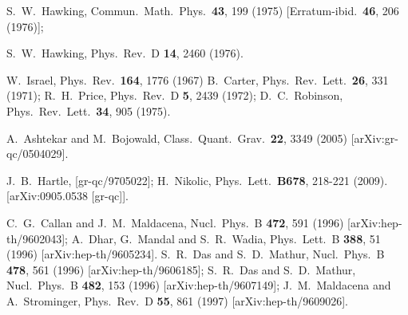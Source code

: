 \documentclass[12pt]{article}
\begin{document}
\begin{thebibliography}{10}


  S.~W.~Hawking,
  Commun.\ Math.\ Phys.\  {\bf 43}, 199 (1975)
  [Erratum-ibid.\  {\bf 46}, 206 (1976)];
  
  S.~W.~Hawking,
  Phys.\ Rev.\  D {\bf 14}, 2460 (1976).
  
  W.~Israel,
  Phys.\ Rev.\  {\bf 164}, 1776 (1967)
  B.~Carter,
  Phys.\ Rev.\ Lett.\  {\bf 26}, 331 (1971);
 R.~H.~Price,
  Phys.\ Rev.\  D {\bf 5}, 2439 (1972);
  D.~C.~Robinson,
  Phys.\ Rev.\ Lett.\  {\bf 34}, 905 (1975).

  A.~Ashtekar and M.~Bojowald,
  Class.\ Quant.\ Grav.\  {\bf 22}, 3349 (2005)
  [arXiv:gr-qc/0504029].

  J.~B.~Hartle,
   [gr-qc/9705022];
H.~Nikolic,
  Phys.\ Lett.\  {\bf B678}, 218-221 (2009).
  [arXiv:0905.0538 [gr-qc]].

C.~G.~Callan and J.~M.~Maldacena,
  Nucl.\ Phys.\  B {\bf 472}, 591 (1996)
  [arXiv:hep-th/9602043];
A.~Dhar, G.~Mandal and S.~R.~Wadia,
  Phys.\ Lett.\  B {\bf 388}, 51 (1996)
  [arXiv:hep-th/9605234].
S.~R.~Das and S.~D.~Mathur,
Nucl.\ Phys.\ B {\bf 478}, 561 (1996)
[arXiv:hep-th/9606185];
  S.~R.~Das and S.~D.~Mathur,
  Nucl.\ Phys.\  B {\bf 482}, 153 (1996)
  [arXiv:hep-th/9607149];
J.~M.~Maldacena and A.~Strominger,
Phys.\ Rev.\ D {\bf 55}, 861 (1997)
[arXiv:hep-th/9609026].
%


\end{thebibliography}
\end{document}
